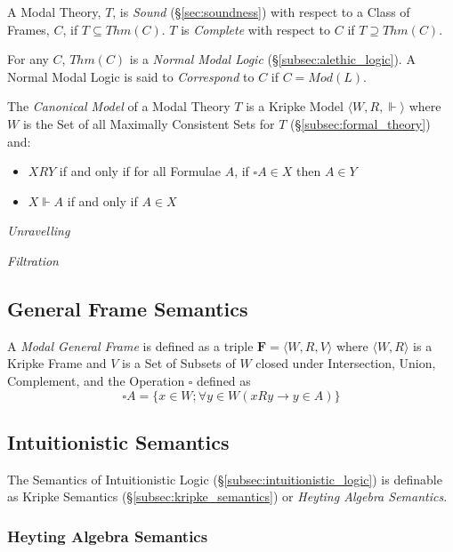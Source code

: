 \documentclass{article}
\begin{document}
A Modal Theory, $T$, is \emph{Sound} (\S\ref{sec:soundness}) with
respect to a Class of Frames, $C$, if $T \subseteq Thm(C)$. $T$ is
\emph{Complete} with respect to $C$ if $T \supseteq Thm(C)$.

For any $C$, $Thm(C)$ is a \emph{Normal Modal Logic}
(\S\ref{subsec:alethic_logic}). A Normal Modal Logic is said to
\emph{Correspond} to $C$ if $C = Mod(L)$.

The \emph{Canonical Model} of a Modal Theory $T$ is a Kripke Model
$\langle W,R, \Vdash \rangle$ where $W$ is the Set of all Maximally
Consistent Sets for $T$ (\S\ref{subsec:formal_theory}) and:
\begin{itemize}
\item $XRY$ if and only if for all Formulae $A$, if $\square A
  \in X$ then $A \in Y$
\item $X\Vdash A$ if and only if $A \in X$
\end{itemize}


\emph{Unravelling}

\emph{Filtration}

\subsection{General Frame Semantics}

A \emph{Modal General Frame} is defined as a triple $\mathbf{F} =
\langle W,R,V \rangle$ where $\langle W,R \rangle$ is a Kripke Frame
and $V$ is a Set of Subsets of $W$ closed under Intersection, Union,
Complement, and the Operation $\square$ defined as
\[
    \square A = \{x \in W; \forall y \in W ( x R y \rightarrow y \in A ) \}
\]

\subsection{Intuitionistic Semantics}

The Semantics of Intuitionistic Logic
(\S\ref{subsec:intuitionistic_logic}) is definable as Kripke Semantics
(\S\ref{subsec:kripke_semantics}) or \emph{Heyting Algebra Semantics}.

\subsubsection{Heyting Algebra Semantics}\label{subsec:heyting_semantics}
\end{document}
